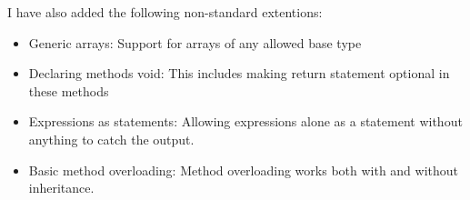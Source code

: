\documentclass[a4paper,11pt]{article}
\begin{document}
   I have also added the following non-standard extentions:

   \begin{itemize}
      \item Generic arrays: Support for arrays of any allowed base type
      \item Declaring methods void: This includes making return statement optional in these methods
      \item Expressions as statements: Allowing expressions alone as a statement without anything to catch the output.
      \item Basic method overloading: Method overloading works both with and without inheritance.
   \end{itemize}
\end{document}
